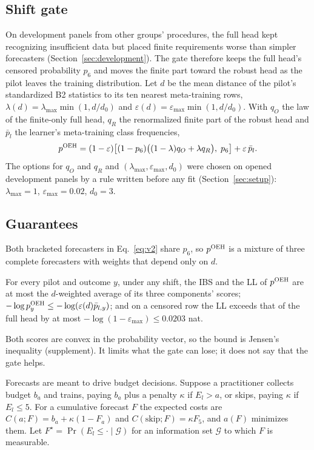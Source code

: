 \subsection{Shift gate}
\label{sec:v2}
On development panels from other groups' procedures, the full head kept recognizing insufficient data but placed finite requirements worse than simpler forecasters (Section~\ref{sec:development}). The gate therefore keeps the full head's censored probability $p_6$ and moves the finite part toward the robust head as the pilot leaves the training distribution. Let $d$ be the mean distance of the pilot's standardized B2 statistics to its ten nearest meta-training rows, $\lambda(d)=\lambda_{\max}\min(1,d/d_0)$ and $\varepsilon(d)=\varepsilon_{\max}\min(1,d/d_0)$. With $q_O$ the law of the finite-only full head, $q_R$ the renormalized finite part of the robust head and $\bar p_l$ the learner's meta-training class frequencies,
\begin{equation}
p^{\textsc{OEH}}=(1-\varepsilon)\bigl[(1-p_6)\bigl((1-\lambda)q_O+\lambda q_R\bigr),\;p_6\bigr]+\varepsilon\,\bar p_l .
\label{eq:v2}
\end{equation}
The options for $q_O$ and $q_R$ and $(\lambda_{\max},\varepsilon_{\max},d_0)$ were chosen on opened development panels by a rule written before any fit (Section~\ref{sec:setup}): $\lambda_{\max}=1$, $\varepsilon_{\max}=0.02$, $d_0=3$.

\subsection{Guarantees}
\label{sec:theory}
Both bracketed forecasters in Eq.~\eqref{eq:v2} share $p_6$, so $p^{\textsc{OEH}}$ is a mixture of three complete forecasters with weights that depend only on $d$.

\begin{proposition}
\label{prop:gate}
For every pilot and outcome $y$, under any shift, the IBS and the LL of $p^{\textsc{OEH}}$ are at most the $d$-weighted average of its three components' scores; $-\log p^{\textsc{OEH}}_y\le-\log(\varepsilon(d)\bar p_{l,y})$; and on a censored row the LL exceeds that of the full head by at most $-\log(1-\varepsilon_{\max})\le0.0203$ nat.
\end{proposition}
\noindent Both scores are convex in the probability vector, so the bound is Jensen's inequality (supplement). It limits what the gate can lose; it does not say that the gate helps.

Forecasts are meant to drive budget decisions. Suppose a practitioner collects budget $b_a$ and trains, paying $b_a$ plus a penalty $\kappa$ if $E_l>a$, or skips, paying $\kappa$ if $E_l\le5$. For a cumulative forecast $F$ the expected costs are $C(a;F)=b_a+\kappa(1-F_a)$ and $C(\mathrm{skip};F)=\kappa F_5$, and $a(F)$ minimizes them. Let $F^\star=\Pr(E_l\le\cdot\mid\mathcal G)$ for an information set $\mathcal G$ to which $F$ is measurable.

